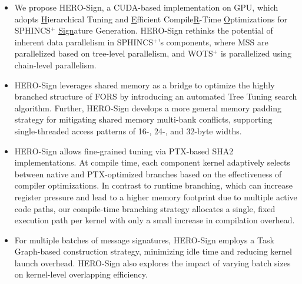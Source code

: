 \documentclass[10pt,conference]{IEEEtran}
\begin{document}
\begin{itemize}[topsep=2pt, partopsep=2pt]

    \item We propose HERO-Sign, a CUDA-based implementation on GPU, which adopts \underline{H}ierarchical Tuning and \underline{E}fficient Compile\underline{R}-Time \underline{O}ptimizations for SPHINCS$^+$ \underline{Sign}ature Generation. HERO-Sign rethinks the potential of inherent data parallelism in SPHINCS$^+$'s components, where MSS are parallelized based on tree-level parallelism, and WOTS$^+$ is parallelized using chain-level parallelism. 

    \item 
    HERO-Sign leverages shared memory as a bridge to optimize the highly branched structure of FORS by introducing an automated Tree Tuning search algorithm.
    Further, HERO-Sign develops a more general memory padding strategy for mitigating shared memory multi-bank conflicts, supporting single-threaded access patterns of 16-, 24-, and 32-byte widths.
    
    
    \item HERO-Sign allows fine-grained tuning via PTX-based SHA2 implementations. At compile time, each component kernel adaptively selects between native and PTX-optimized branches based on the effectiveness of compiler optimizations. In contrast to runtime branching, which can increase register pressure and lead to a higher memory footprint due to multiple active code paths, our compile-time branching strategy allocates a single, fixed execution path per kernel with only a small increase in compilation overhead.
    \item For multiple batches of message signatures, HERO-Sign employs a Task Graph-based construction strategy, minimizing idle time and reducing kernel launch overhead. HERO-Sign also explores the impact of varying batch sizes on kernel-level overlapping efficiency.
\end{itemize}



\end{document}
